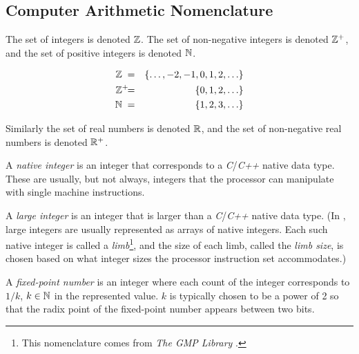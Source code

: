 \subsection{Computer Arithmetic Nomenclature}
\label{ciov0:snom0:scan0}

The set of integers is denoted 
${\mathbb{Z}}{}$\@.  The set of 
non-negative integers is denoted 
${\mathbb{Z}^+}{}$, and 
the set of positive integers is denoted 
${\mathbb{N}}{}$.  

\begin{eqnarray}
\label{eq:ciov0:snom0:scan0:01}
{\mathbb{Z}}{}   \;    & = & \{ \ldots , -2, -1, 0, 1, 2, \ldots \} \\
\label{eq:ciov0:snom0:scan0:02}
{\mathbb{Z}^+}{} \!\!\!\!\; & = & \{ 0, 1, 2, \ldots \}         \\
\label{eq:ciov0:snom0:scan0:03}
{\mathbb{N}}{}  \;  & = & \{ 1, 2, 3, \ldots \}
\end{eqnarray}

Similarly the set of real numbers is denoted 
${\mathbb{R}}$, and the set of 
non-negative real numbers is denoted 
${\mathbb{R}^+}$.  

A \emph{native integer} is an integer 
that corresponds to a \emph{C}/\emph{C++} native data type.  
These are usually, but not always, integers that the 
processor can manipulate with single machine instructions.  

A \emph{large integer} is an integer 
that is larger than a \emph{C}/\emph{C++} native data type.  
(In \emph{\productbasenameshort{}}, large integers are 
usually represented as arrays of native integers.  Each such 
native integer is called a \emph{limb}\footnote{This nomenclature comes 
from \emph{The GMP Library} 
\cite{bibref:w:gmplibhomepage}.}, and the size of each limb, 
called the \emph{limb size}, is chosen 
based on what integer sizes the processor instruction set 
accommodates.) 

A \emph{fixed-point number} is an 
integer where each count of the integer corresponds to 
$1/k$, $k \in {\mathbb{N}}$ in the represented value.  
$k$ is typically chosen to be a power of 2 so that the radix 
point of the fixed-point number appears between two bits.  

